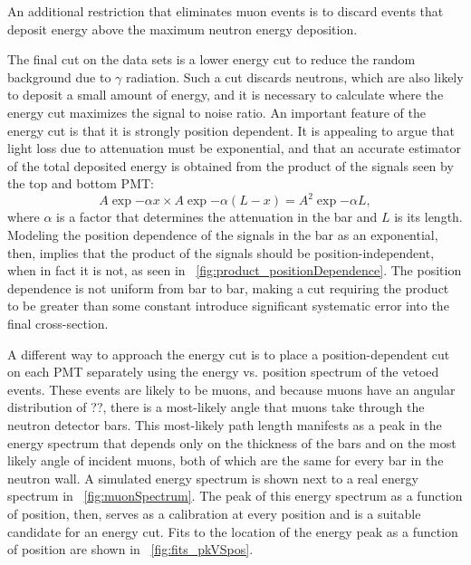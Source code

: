 An additional restriction that eliminates muon events is to discard events that deposit energy above the maximum neutron energy deposition.    

The final cut on the data sets is a lower energy cut to reduce the random background due to $\gamma$ radiation.  Such a cut discards neutrons, which are also likely to deposit a small amount of energy, and it is necessary to calculate where the energy cut maximizes the signal to noise ratio.  An important feature of the energy cut is that it is strongly position dependent.  It is appealing to argue that light loss due to attenuation must be exponential, and that an accurate estimator of the total deposited energy is obtained from the product of the signals seen by the top and bottom PMT:
\begin{equation}
A\exp{-\alpha x}\times A\exp{-\alpha (L-x)} = A^2\exp{-\alpha L},
\end{equation}
where $\alpha$ is a factor that determines the attenuation in the bar and $L$ is its length.  Modeling the position dependence of the signals in the bar as an exponential, then, implies that the product of the signals should be position-independent, when in fact it is not, as seen in {\fig}~\ref{fig:product_positionDependence}.  The position dependence is not uniform from bar to bar, making a cut requiring the product to be greater than some constant introduce significant systematic error into the final cross-section.

A different way to approach the energy cut is to place a position-dependent cut on each PMT separately using the energy vs. position spectrum of the vetoed events.  These events are likely to be muons, and because muons have an angular distribution of ??, there is a most-likely angle that muons take through the neutron detector bars.  This most-likely path length manifests as a peak in the energy spectrum that depends only on the thickness of the bars and on the most likely angle of incident muons, both of which are the same for every bar in the neutron wall.  A simulated energy spectrum is shown next to a real energy spectrum in {\fig}~\ref{fig:muonSpectrum}.  The peak of this energy spectrum as a function of position, then, serves as a calibration at every position and is a suitable candidate for an energy cut.  Fits to the location of the energy peak as a function of position are shown in {\fig}~\ref{fig:fits_pkVSpos}.

